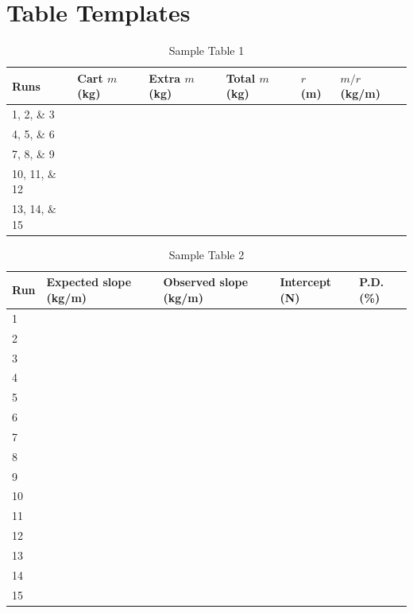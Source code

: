 \section{Table Templates}
%
\begin{table}[ht!]
    \begin{center}
        \begin{tabular}{l | l | l | l | l | l}
            \textbf{Runs} & Cart $m$ (kg) & Extra $m$ (kg) & Total $m$ (kg) & $r$ (m) & $m/r$ (kg/m) \\
            \hline
            1, 2, \& 3 & & & & & \\
            4, 5, \& 6 & & & & & \\
            7, 8, \& 9 & & & & & \\
            10, 11, \& 12 & & & & & \\
            13, 14, \& 15 & & & & & \\
            \hline
        \end{tabular}
    \end{center}
    \caption{Sample Table 1}
\end{table}
%
\begin{table}[ht!]
    \begin{center}
        \begin{tabular}{l | l | l | l | l}
            \textbf{Run} & \textbf{Expected slope} (kg/m) & \textbf{Observed slope} (kg/m) & \textbf{Intercept} (N) & \textbf{P.D.} (\%) \\
            \hline
            1 & & & & \\
            2 & & & & \\
            3 & & & & \\
            \hline
            4 & & & & \\
            5 & & & & \\
            6 & & & & \\
            \hline
            7 & & & & \\
            8 & & & & \\
            9 & & & & \\
            \hline
            10 & & & & \\
            11 & & & & \\
            12 & & & & \\
            \hline
            13 & & & & \\
            14 & & & & \\
            15 & & & & \\
            \hline
        \end{tabular}
    \end{center}
    \caption{Sample Table 2}
\end{table}
%
\newpage
